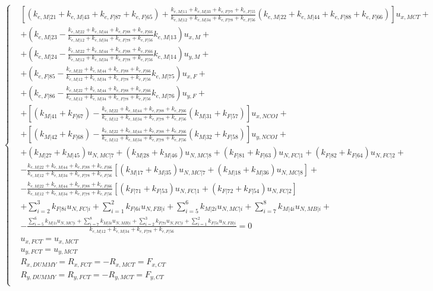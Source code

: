 \documentclass[a4paper]{jpconf}
\begin{document}
\begin{equation}
\begin{cases}
&\left[\left(k_{e,M|21}+k_{e,M|43}+k_{e,F|87}+k_{e,F|65}\right)+\frac{k_{e,M|11}+k_{e,M|33}+k_{e,F|77}+k_{e,F|55}}{k_{e,M|12}+k_{e,M|34}+k_{e,F|78}+k_{e,F|56}}\left(k_{e,M|22}+k_{e,M|44}+k_{e,F|88}+k_{e,F|66}\right)\right]u_{x,MCT}+\\
&+\left(k_{e,M|23}-\frac{k_{e,M|22}+k_{e,M|44}+k_{e,F|88}+k_{e,F|66}}{k_{e,M|12}+k_{e,M|34}+k_{e,F|78}+k_{e,F|56}}k_{e,M|13}\right)u_{x,M}+\\
&+\left(k_{e,M|24}-\frac{k_{e,M|22}+k_{e,M|44}+k_{e,F|88}+k_{e,F|66}}{k_{e,M|12}+k_{e,M|34}+k_{e,F|78}+k_{e,F|56}}k_{e,M|14}\right)u_{y,M}+\\
&+\left(k_{e,F|85}-\frac{k_{e,M|22}+k_{e,M|44}+k_{e,F|88}+k_{e,F|66}}{k_{e,M|12}+k_{e,M|34}+k_{e,F|78}+k_{e,F|56}}k_{e,M|75}\right)u_{x,F}+\\
&+\left(k_{e,F|86}-\frac{k_{e,M|22}+k_{e,M|44}+k_{e,F|88}+k_{e,F|66}}{k_{e,M|12}+k_{e,M|34}+k_{e,F|78}+k_{e,F|56}}k_{e,M|76}\right)u_{y,F}+\\
&+\left[\left(k_{M|41}+k_{F|67}\right)-\frac{k_{e,M|22}+k_{e,M|44}+k_{e,F|88}+k_{e,F|66}}{k_{e,M|12}+k_{e,M|34}+k_{e,F|78}+k_{e,F|56}}\left(k_{M|31}+k_{F|57}\right)\right]u_{x,NCOI}+\\
&+\left[\left(k_{M|42}+k_{F|68}\right)-\frac{k_{e,M|22}+k_{e,M|44}+k_{e,F|88}+k_{e,F|66}}{k_{e,M|12}+k_{e,M|34}+k_{e,F|78}+k_{e,F|56}}\left(k_{M|32}+k_{F|58}\right)\right]u_{y,NCOI}+\\
&+\left(k_{M|27}+k_{M|45}\right)u_{N,MC|7}+\left(k_{M|28}+k_{M|46}\right)u_{N,MC|8}+\left(k_{F|81}+k_{F|63}\right)u_{N,FC|1}+\left(k_{F|82}+k_{F|64}\right)u_{N,FC|2}+\\
&-\frac{k_{e,M|22}+k_{e,M|44}+k_{e,F|88}+k_{e,F|66}}{k_{e,M|12}+k_{e,M|34}+k_{e,F|78}+k_{e,F|56}}\left[\left(k_{M|17}+k_{M|35}\right)u_{N,MC|7}+\left(k_{M|18}+k_{M|36}\right)u_{N,MC|8}\right]+\\&
-\frac{k_{e,M|22}+k_{e,M|44}+k_{e,F|88}+k_{e,F|66}}{k_{e,M|12}+k_{e,M|34}+k_{e,F|78}+k_{e,F|56}}\left[\left(k_{F|71}+k_{F|53}\right)u_{N,FC|1}+\left(k_{F|72}+k_{F|54}\right)u_{N,FC|2}\right]\\
&+\sum_{i=2}^{3}k_{F|8i}u_{N,FC|i}+\sum_{i=1}^{2}k_{F|6i}u_{N,FB|i}+\sum_{i=5}^{6}k_{M|2i}u_{N,MC|i}+\sum_{i=7}^{8}k_{M|4i}u_{N,MB|i}+\\
&-\frac{\sum_{i=5}^{6}k_{M|1i}u_{N,MC|i}+\sum_{i=7}^{8}k_{M|3i}u_{N,MB|i}+\sum_{i=2}^{3}k_{F|7i}u_{N,FC|i}+\sum_{i=1}^{2}k_{F|5i}u_{N,FB|i}}{k_{e,M|12}+k_{e,M|34}+k_{e,F|78}+k_{e,F|56}}=0\\[10pt]

&u_{x,FCT}=u_{x,MCT}\\
&u_{y,FCT}=u_{y,MCT}\\[10pt]
&R_{x,DUMMY}=R_{x,FCT}=-R_{x,MCT}=F_{x,CT}\\
&R_{y,DUMMY}=R_{y,FCT}=-R_{y,MCT}=F_{y,CT}\\
\end{cases}
\end{equation}
\end{document}
